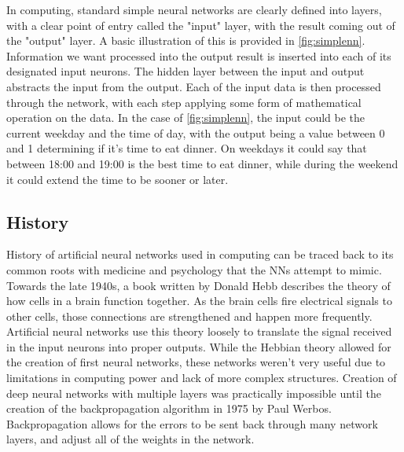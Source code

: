 In computing, standard simple neural networks are clearly defined into layers, with a clear point of entry called the "input" layer, with the result coming out of the "output" layer. 
A basic illustration of this is provided in \cref{fig:simplenn}. 
Information we want processed into the output result is inserted into each of its designated input neurons. 
The hidden layer between the input and output abstracts the input from the output. 
Each of the input data is then processed through the network, with each step applying some form of mathematical operation on the data. 
In the case of \cref{fig:simplenn}, the input could be the current weekday and the time of day, with the output being a value between 0 and 1 determining if it's time to eat dinner. 
On weekdays it could say that between 18:00 and 19:00 is the best time to eat dinner, while during the weekend it could extend the time to be sooner or later. 


\subsection{History}


History of artificial neural networks used in computing can be traced back to its common roots with medicine and psychology that the NNs attempt to mimic. 
Towards the late 1940s, a book written by Donald Hebb \cite{hebb2005organization} describes the theory of how cells in a brain function together. 
As the brain cells fire electrical signals to other cells, those connections are strengthened and happen more frequently.
Artificial neural networks use this theory loosely to translate the signal received in the input neurons into proper outputs.
While the Hebbian theory allowed for the creation of first neural networks, these networks weren't very useful due to limitations in computing power and lack of more complex structures. 
Creation of deep neural networks with multiple layers was practically impossible until the creation of the backpropagation algorithm in 1975 by Paul Werbos\cite{werbos1975beyond}. 
Backpropagation allows for the errors to be sent back through many network layers, and adjust all of the weights in the network.


